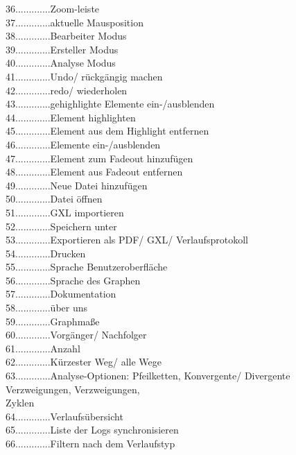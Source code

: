 \documentclass[enabledeprecatedfontcommands,fontsize=11pt,paper=a4,twoside]{scrartcl}
\newcounter{one}
\newcommand*{\hdo}{.............}
\begin{document}
	36\hdo Zoom-leiste \\
	37\hdo aktuelle Mausposition \\
	38\hdo Bearbeiter Modus\\
	39\hdo Ersteller Modus\\
	40\hdo Analyse Modus\\
	41\hdo Undo/ rückgängig machen\\
	42\hdo redo/ wiederholen\\
	43\hdo gehighlighte Elemente ein-/ausblenden\\
	44\hdo Element highlighten\\
	45\hdo Element aus dem Highlight entfernen\\
	46\hdo Elemente ein-/ausblenden\\
	47\hdo Element zum Fadeout hinzufügen\\
	48\hdo Element aus Fadeout entfernen\\
	49\hdo Neue Datei hinzufügen\\
	50\hdo Datei öffnen\\
	51\hdo GXL importieren\\
	52\hdo Speichern unter\\
	53\hdo Exportieren als PDF/ GXL/ Verlaufsprotokoll\\
	54\hdo Drucken\\
	55\hdo Sprache Benutzeroberfläche\\
	56\hdo Sprache des Graphen\\
	57\hdo Dokumentation\\
	58\hdo über uns \\
	59\hdo Graphmaße\\
	60\hdo Vorgänger/ Nachfolger\\
	61\hdo Anzahl\\
	62\hdo Kürzester Weg/ alle Wege\\
	63\hdo Analyse-Optionen: Pfeilketten, Konvergente/ Divergente Verzweigungen, Verzweigungen,\\ 		
		\hspace*{1.7cm} Zyklen\\
	64\hdo Verlaufsübersicht\\
	65\hdo Liste der Logs synchronisieren\\
	66\hdo Filtern nach dem Verlaufstyp\\
	
\end{document}
